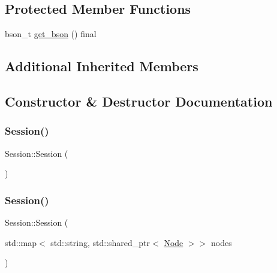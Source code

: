 \subsection*{Protected Member Functions}
\begin{DoxyCompactItemize}
\item 
bson\+\_\+t \hyperlink{class_session_aa517fe6138a0cc32e27ddf1eb7331520}{get\+\_\+bson} () final
\end{DoxyCompactItemize}
\subsection*{Additional Inherited Members}


\subsection{Constructor \& Destructor Documentation}
\mbox{\label{class_session_ad92ef09b872c9227e38a6efdd4d8a837}} 
\subsubsection{\texorpdfstring{Session()}{Session()}\hspace{0.1cm}{\footnotesize\ttfamily [1/2]}}
{\footnotesize\ttfamily Session\+::\+Session (\begin{DoxyParamCaption}{ }\end{DoxyParamCaption})\hspace{0.3cm}{\ttfamily [inline]}}

\mbox{\label{class_session_a556c8971b03563ae3c94dc1d19cbed27}} 
\subsubsection{\texorpdfstring{Session()}{Session()}\hspace{0.1cm}{\footnotesize\ttfamily [2/2]}}
{\footnotesize\ttfamily Session\+::\+Session (\begin{DoxyParamCaption}\item[{std\+::map$<$ std\+::string, std\+::shared\+\_\+ptr$<$ \hyperlink{class_node}{Node} $>$$>$}]{nodes }\end{DoxyParamCaption})\hspace{0.3cm}{\ttfamily [inline]}}



